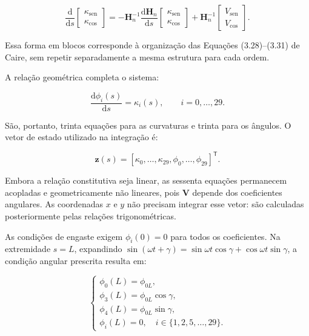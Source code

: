 \documentclass[arial,centeredequations,english,brazilian,oneside,section=TITLE]{ifes8}
\begin{document}
\begin{equation}
  \frac{\mathrm{d}}{\mathrm{d}s}
  \begin{bmatrix}\kappa_{\mathrm{sen}}\\ \kappa_{\mathrm{cos}}\end{bmatrix}
  =-\mathbf H_n^{-1}\frac{\mathrm{d}\mathbf H_n}{\mathrm{d}s}
    \begin{bmatrix}\kappa_{\mathrm{sen}}\\ \kappa_{\mathrm{cos}}\end{bmatrix}
    +\mathbf H_n^{-1}
    \begin{bmatrix}V_{\mathrm{sen}}\\ V_{\mathrm{cos}}\end{bmatrix}.
  \label{eq:governo-linear-par-harmonico}
\end{equation}

Essa forma em blocos corresponde à organização das Equações (3.28)--(3.31)
de Caire, sem repetir separadamente a mesma estrutura para cada ordem.

A relação geométrica completa o sistema:

\begin{equation}
  \frac{\mathrm{d}\phi_i(s)}{\mathrm{d}s}=\kappa_i(s),
  \qquad i=0,\ldots,29.
  \label{eq:governo-linear-coeficientes-angulo}
\end{equation}

São, portanto, trinta equações para as curvaturas e trinta para os ângulos.
O vetor de estado utilizado na integração é:

\begin{equation}
  \boldsymbol z(s)=
    [\kappa_0,\ldots,\kappa_{29},\phi_0,\ldots,\phi_{29}]^{\mathsf T}.
  \label{eq:estado-sistema-linear}
\end{equation}

Embora a relação constitutiva seja linear, as sessenta equações permanecem
acopladas e geometricamente não lineares, pois $\boldsymbol V$ depende dos
coeficientes angulares. As coordenadas $x$ e $y$ não precisam integrar esse
vetor: são calculadas posteriormente pelas relações trigonométricas.

As condições de engaste exigem $\phi_i(0)=0$ para todos os coeficientes.
Na extremidade $s=L$, expandindo
$\sin(\omega t+\gamma)=\sin\omega t\cos\gamma+\cos\omega t\sin\gamma$,
a condição angular prescrita resulta em:

\begin{equation}
  \begin{cases}
    \phi_0(L)=\phi_{0L},\\
    \phi_3(L)=\phi_{0L}\cos\gamma,\\
    \phi_4(L)=\phi_{0L}\sin\gamma,\\
    \phi_i(L)=0,\quad i\in\{1,2,5,\ldots,29\}.
  \end{cases}
  \label{eq:contorno-coeficientes-lineares}
\end{equation}
\end{document}
